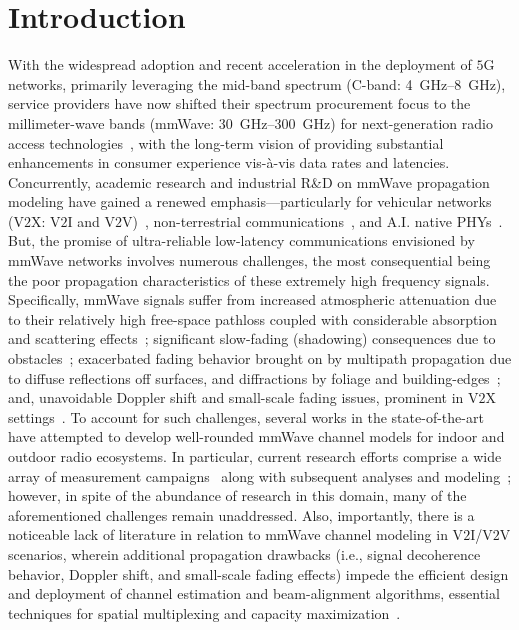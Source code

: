 \documentclass[10pt, twocolumn]{IEEEtran}
\begin{document}
\section{Introduction}\label{S1}
With the widespread adoption and recent acceleration in the deployment of $5$G networks, primarily leveraging the mid-band spectrum (C-band: \SIrange{4}{8}{\giga\hertz}), service providers have now shifted their spectrum procurement focus to the millimeter-wave bands (mmWave: \SIrange{30}{300}{\giga\hertz}) for next-generation radio access technologies~\cite{mmWaveSurvey, Commercial, 5GBSurvey, 6GSurvey}, with the long-term vision of providing substantial enhancements in consumer experience vis-\`{a}-vis data rates and latencies. Concurrently, academic research and industrial R\&D on mmWave propagation modeling have gained a renewed emphasis---particularly for vehicular networks (V$2$X: V$2$I and V$2$V)~\cite{VehicularBeamSelection, CVBeamAlignmentV2X}, non-terrestrial communications~\cite{mmWaveRuralNTNOpportunities, UAVBeamTracking}, and A.I. native PHYs~\cite{6GAINative, OTAGANs}. But, the promise of ultra-reliable low-latency communications envisioned by mmWave networks involves numerous challenges, the most consequential being the poor propagation characteristics of these extremely high frequency signals. Specifically, mmWave signals suffer from increased atmospheric attenuation due to their relatively high free-space pathloss coupled with considerable absorption and scattering effects~\cite{Rappaport}; significant slow-fading (shadowing) consequences due to obstacles~\cite{SuburbanGeometryJournal}; exacerbated fading behavior brought on by multipath propagation due to diffuse reflections off surfaces, and diffractions by foliage and building-edges~\cite{Outdoor28G}; and, unavoidable Doppler shift and small-scale fading issues, prominent in V$2$X settings~\cite{V2XBlockages}. To account for such challenges, several works in the state-of-the-art have attempted to develop well-rounded mmWave channel models for indoor and outdoor radio ecosystems. In particular, current research efforts comprise a wide array of measurement campaigns~\cite{Purdue, Foliage, AgileLink, Harvard, Outdoor28G, Indoor60G, PDAPs, MolischSpatialIndoorOutdoor, DopplerHST} along with subsequent analyses and modeling~\cite{SuburbanGeometryJournal, FoliageSimulations, Indoor60G, Qualcomm3GPP, MacCartneyModelsOverview, SpatialConsistencyOriginal, MacCartneyRural, MolischEstimate, NISTModeling, QDC_NIST, D2DHumanBlockage}; however, in spite of the abundance of research in this domain, many of the aforementioned challenges remain unaddressed. Also, importantly, there is a noticeable lack of literature in relation to mmWave channel modeling in V$2$I/V$2$V scenarios, wherein additional propagation drawbacks (i.e., signal decoherence behavior, Doppler shift, and small-scale fading effects) impede the efficient design and deployment of channel estimation and beam-alignment algorithms, essential techniques for spatial multiplexing and capacity maximization~\cite{VehicularBeamSelection, CVBeamAlignmentV2X}. 
\end{document}
